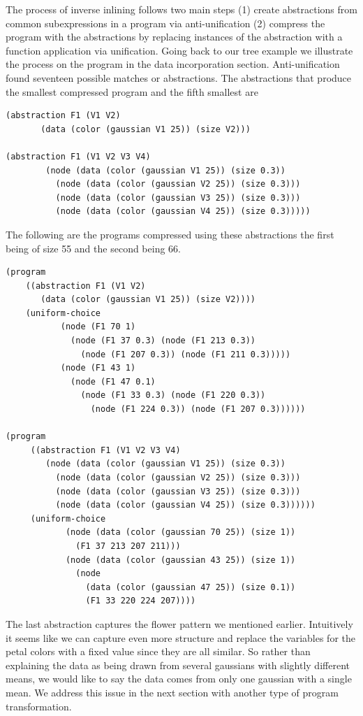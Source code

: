 \documentclass[a4paper,10pt]{article}
\begin{document}
The process of inverse inlining follows two main steps (1) create abstractions from common subexpressions in a program via anti-unification (2) compress the program with the abstractions by replacing instances of the abstraction with a function application via unification.  Going back to our tree example we illustrate the process on the program in the data incorporation section.
Anti-unification found seventeen possible matches or abstractions.  The abstractions that produce the smallest compressed program and the fifth smallest are 
\begin{lstlisting}
(abstraction F1 (V1 V2)
       (data (color (gaussian V1 25)) (size V2)))

(abstraction F1 (V1 V2 V3 V4)
        (node (data (color (gaussian V1 25)) (size 0.3))
          (node (data (color (gaussian V2 25)) (size 0.3)))
          (node (data (color (gaussian V3 25)) (size 0.3)))
          (node (data (color (gaussian V4 25)) (size 0.3)))))
\end{lstlisting}
The following are the programs compressed using these abstractions the first being of size 55 and the second being 66.
\begin{lstlisting}
(program
    ((abstraction F1 (V1 V2)
       (data (color (gaussian V1 25)) (size V2))))
    (uniform-choice
           (node (F1 70 1)
             (node (F1 37 0.3) (node (F1 213 0.3))
               (node (F1 207 0.3)) (node (F1 211 0.3)))))
           (node (F1 43 1)
             (node (F1 47 0.1)
               (node (F1 33 0.3) (node (F1 220 0.3))
                 (node (F1 224 0.3)) (node (F1 207 0.3))))))

(program
     ((abstraction F1 (V1 V2 V3 V4)
        (node (data (color (gaussian V1 25)) (size 0.3))
          (node (data (color (gaussian V2 25)) (size 0.3)))
          (node (data (color (gaussian V3 25)) (size 0.3)))
          (node (data (color (gaussian V4 25)) (size 0.3))))))
     (uniform-choice
            (node (data (color (gaussian 70 25)) (size 1))
              (F1 37 213 207 211)))
            (node (data (color (gaussian 43 25)) (size 1))
              (node
                (data (color (gaussian 47 25)) (size 0.1))
                (F1 33 220 224 207))))
\end{lstlisting}
The last abstraction captures the flower pattern we mentioned earlier.  Intuitively it seems like we can capture even more structure and replace the variables for the petal colors with a fixed value since they are all similar.  So rather than explaining the data as being drawn from several gaussians with slightly different means, we would like to say the data comes from only one gaussian with a single mean.  We address this issue in the next section with another type of program transformation.
\end{document}
